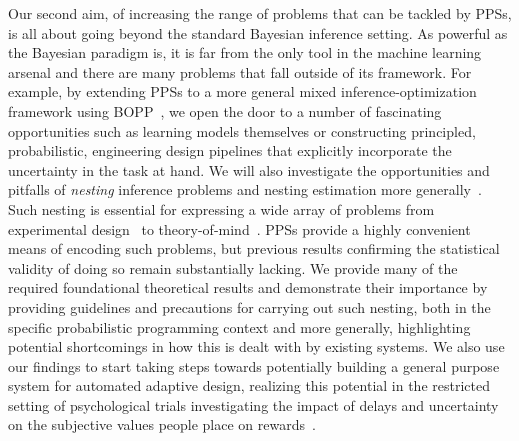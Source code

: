 Our second aim, of increasing the range of problems that can be tackled by PPSs, is all about
going beyond the standard Bayesian inference setting.  As powerful as the Bayesian paradigm is,
it is far from the only tool in the machine learning arsenal and there are many problems that fall
outside of its framework.  For example, by extending PPSs to a more general mixed
inference-optimization framework using BOPP~\citep{rainforth2016bayesian}, we open the door to
a number of fascinating opportunities such as learning models themselves or constructing
principled, probabilistic, engineering design pipelines that explicitly incorporate
the uncertainty in the task at hand.  We will also investigate the opportunities and pitfalls
of \emph{nesting} inference problems and nesting estimation more
generally~\citep{rainforth2017pitfalls}.  Such nesting is essential for expressing a wide array
of problems from experimental design~\citep{chaloner1995bayesian} to
theory-of-mind~\citep{stuhlmuller2014reasoning}.  PPSs provide a highly convenient means
of encoding such problems, but previous results confirming the statistical validity of doing
so remain substantially lacking.  We provide many of the required foundational theoretical results and
demonstrate their importance by providing guidelines and precautions for carrying out such nesting,
both in the specific probabilistic programming context and more generally, highlighting potential
shortcomings in how this is dealt with by existing systems.  We also use our findings to start
taking steps towards potentially building a general purpose system for automated adaptive
design, realizing this potential in the restricted setting of psychological trials
investigating the impact of delays and uncertainty on the subjective values people place
on rewards~\citep{vincent2017darc}.
